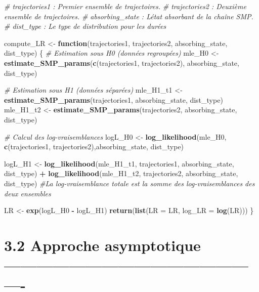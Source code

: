\documentclass[
]{article}
\newenvironment{Shaded}{\begin{snugshade}}{\end{snugshade}}
\newcommand{\AttributeTok}[1]{\textcolor[rgb]{0.13,0.29,0.53}{#1}}
\newcommand{\CommentTok}[1]{\textcolor[rgb]{0.56,0.35,0.01}{\textit{#1}}}
\newcommand{\ControlFlowTok}[1]{\textcolor[rgb]{0.13,0.29,0.53}{\textbf{#1}}}
\newcommand{\FunctionTok}[1]{\textcolor[rgb]{0.13,0.29,0.53}{\textbf{#1}}}
\newcommand{\NormalTok}[1]{#1}
\newcommand{\OtherTok}[1]{\textcolor[rgb]{0.56,0.35,0.01}{#1}}
\newcommand{\SpecialCharTok}[1]{\textcolor[rgb]{0.81,0.36,0.00}{\textbf{#1}}}
\begin{document}
\begin{Shaded}
\begin{Highlighting}[]
\CommentTok{\# trajectories1 : Premier ensemble de trajectoires.}
\CommentTok{\# trajectories2 : Deuxième ensemble de trajectoires.}
\CommentTok{\# absorbing\_state : L\textquotesingle{}état absorbant de la chaîne SMP.}
\CommentTok{\# dist\_type : Le type de distribution pour les durées}


\NormalTok{compute\_LR }\OtherTok{\textless{}{-}} \ControlFlowTok{function}\NormalTok{(trajectories1, trajectories2, absorbing\_state, dist\_type) \{}
  \CommentTok{\# Estimation sous H0 (données regroupées)}
\NormalTok{  mle\_H0 }\OtherTok{\textless{}{-}} \FunctionTok{estimate\_SMP\_params}\NormalTok{(}\FunctionTok{c}\NormalTok{(trajectories1, trajectories2), }
\NormalTok{                               absorbing\_state, dist\_type)}
  
  \CommentTok{\# Estimation sous H1 (données séparées)}
\NormalTok{  mle\_H1\_t1 }\OtherTok{\textless{}{-}} \FunctionTok{estimate\_SMP\_params}\NormalTok{(trajectories1, absorbing\_state, dist\_type)}
\NormalTok{  mle\_H1\_t2 }\OtherTok{\textless{}{-}} \FunctionTok{estimate\_SMP\_params}\NormalTok{(trajectories2, absorbing\_state, dist\_type)}
  
  \CommentTok{\# Calcul des log{-}vraisemblances}
\NormalTok{  logL\_H0 }\OtherTok{\textless{}{-}} \FunctionTok{log\_likelihood}\NormalTok{(mle\_H0, }\FunctionTok{c}\NormalTok{(trajectories1, trajectories2),absorbing\_state, dist\_type)}
  
\NormalTok{  logL\_H1 }\OtherTok{\textless{}{-}} \FunctionTok{log\_likelihood}\NormalTok{(mle\_H1\_t1, trajectories1, absorbing\_state, dist\_type) }\SpecialCharTok{+} \FunctionTok{log\_likelihood}\NormalTok{(mle\_H1\_t2, trajectories2, absorbing\_state, dist\_type) }\CommentTok{\#La log{-}vraisemblance totale est la somme des log{-}vraisemblances des deux ensembles}
  
\NormalTok{  LR }\OtherTok{\textless{}{-}} \FunctionTok{exp}\NormalTok{(logL\_H0 }\SpecialCharTok{{-}}\NormalTok{ logL\_H1)}
  \FunctionTok{return}\NormalTok{(}\FunctionTok{list}\NormalTok{(}\AttributeTok{LR =}\NormalTok{ LR, }\AttributeTok{log\_LR =} \FunctionTok{log}\NormalTok{(LR)))}
\NormalTok{\}}
\end{Highlighting}
\end{Shaded}

\section{3.2 Approche asymptotique
-------------------------------------------------}\label{approche-asymptotique--}
\end{document}

